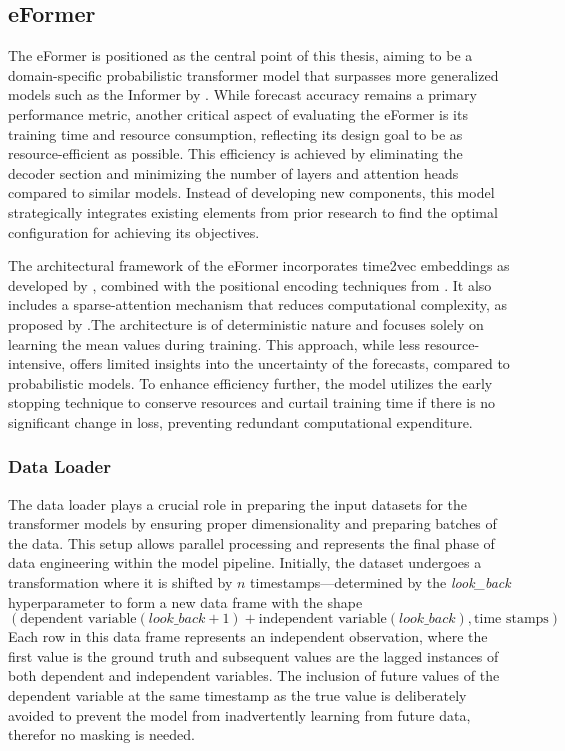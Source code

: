\documentclass{article}
\begin{document}
\subsection{eFormer}

The eFormer is positioned as the central point of this thesis, aiming to be a domain-specific probabilistic transformer model that surpasses more generalized models such as the Informer by \cite{Informer}. While forecast accuracy remains a primary performance metric, another critical aspect of evaluating the eFormer is its training time and resource consumption, reflecting its design goal to be as resource-efficient as possible. This efficiency is achieved by eliminating the decoder section and minimizing the number of layers and attention heads compared to similar models. Instead of developing new components, this model strategically integrates existing elements from prior research to find the optimal configuration for achieving its objectives.

The architectural framework of the eFormer incorporates time2vec embeddings as developed by \cite{time2vec}, combined with the positional encoding techniques from \cite{vanilla-transformer}. It also includes a sparse-attention mechanism that reduces computational complexity, as proposed by \cite{Informer}.The architecture is of deterministic nature and focuses solely on learning the mean values during training. This approach, while less resource-intensive, offers limited insights into the uncertainty of the forecasts, compared to probabilistic models. To enhance efficiency further, the model utilizes the early stopping technique to conserve resources and curtail training time if there is no significant change in loss, preventing redundant computational expenditure.


\subsubsection{Data Loader}

The data loader plays a crucial role in preparing the input datasets for the transformer models by ensuring proper dimensionality and preparing batches of the data. This setup allows parallel processing and represents the final phase of data engineering within the model pipeline. Initially, the dataset undergoes a transformation where it is shifted by $n$ timestamps—determined by the \textit{look\_back} hyperparameter to form a new data frame with the shape 
\begin{equation*}
    (\text{dependent variable}(look\_back + 1) + \text{independent variable}(look\_back), \text{time stamps})
\end{equation*}
Each row in this data frame represents an independent observation, where the first value is the ground truth and subsequent values are the lagged instances of both dependent and independent variables. The inclusion of future values of the dependent variable at the same timestamp as the true value is deliberately avoided to prevent the model from inadvertently learning from future data, therefor no masking is needed.
\end{document}
